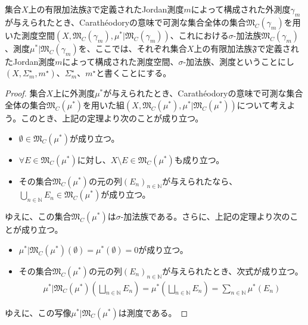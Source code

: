 \documentclass[dvipdfmx]{jsarticle}
\begin{document}
\begin{dfn}
集合$X$上の有限加法族$\mathfrak{F}$で定義されたJordan測度$m$によって構成された外測度$\gamma_{m}$が与えられたとき、Carathéodoryの意味で可測な集合全体の集合$\mathfrak{M}_{C}\left( \gamma_{m} \right)$を用いた測度空間$\left( X,\mathfrak{M}_{C}\left( \gamma_{m} \right),\mu^{*}|\mathfrak{M}_{C}\left( \gamma_{m} \right) \right)$、これにおける$\sigma$-加法族$\mathfrak{M}_{C}\left( \gamma_{m} \right)$、測度$\mu^{*}|\mathfrak{M}_{C}\left( \gamma_{m} \right)$を、ここでは、それぞれ集合$X$上の有限加法族$\mathfrak{F}$で定義されたJordan測度$m$によって構成された測度空間、$\sigma$-加法族、測度ということにし$\left( X,\varSigma_{m}^{\star},m^{\star} \right)$、$\varSigma_{m}^{\star}$、$m^{\star}$と書くことにする。
\end{dfn}
\begin{proof}
集合$X$上に外測度$\mu^{*}$が与えられたとき、Carathéodoryの意味で可測な集合全体の集合$\mathfrak{M}_{C}\left( \mu^{*} \right)$を用いた組$\left( X,\mathfrak{M}_{C}\left( \mu^{*} \right),\mu^{*}|\mathfrak{M}_{C}\left( \mu^{*} \right) \right)$について考えよう。このとき、上記の定理より次のことが成り立つ。
\begin{itemize}
\item
  $\emptyset \in \mathfrak{M}_{C}\left( \mu^{*} \right)$が成り立つ。
\item
  $\forall E \in \mathfrak{M}_{C}\left( \mu^{*} \right)$に対し、$X \setminus E \in \mathfrak{M}_{C}\left( \mu^{*} \right)$も成り立つ。
\item
  その集合$\mathfrak{M}_{C}\left( \mu^{*} \right)$の元の列$\left( E_{n} \right)_{n \in \mathbb{N}}$が与えられたなら、$\bigcup_{n \in \mathbb{N}} E_{n} \in \mathfrak{M}_{C}\left( \mu^{*} \right)$が成り立つ。
\end{itemize}
ゆえに、この集合$\mathfrak{M}_{C}\left( \mu^{*} \right)$は$\sigma$-加法族である。さらに、上記の定理より次のことが成り立つ。
\begin{itemize}
\item
  $\mu^{*}|\mathfrak{M}_{C}\left( \mu^{*} \right)(\emptyset) = \mu^{*}(\emptyset) = 0$が成り立つ。
\item
  その集合$\mathfrak{M}_{C}\left( \mu^{*} \right)$の元の列$\left( E_{n} \right)_{n \in \mathbb{N}}$が与えられたとき、次式が成り立つ。
\begin{align*}
\mu^{*}|\mathfrak{M}_{C}\left( \mu^{*} \right)\left( \bigsqcup_{n \in \mathbb{N}} E_{n} \right) = \mu^{*}\left( \bigsqcup_{n \in \mathbb{N}} E_{n} \right) = \sum_{n \in \mathbb{N}} {\mu^{*}\left( E_{n} \right)}
\end{align*}
\end{itemize}
ゆえに、この写像$\mu^{*}|\mathfrak{M}_{C}\left( \mu^{*} \right)$は測度である。
\end{proof}
\end{document}
